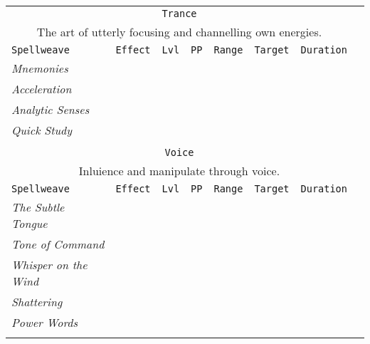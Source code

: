 \documentclass[10pt,a4paper]{article}
\begin{document}
\begin{table}[htbp!]
\begin{tabular}{llllllll}
	
    	
  \multicolumn{7}{c}{\texttt{Trance}}\\
  \multicolumn{7}{c}{The art of utterly focusing and channelling own energies.}\\
    \hline
 \texttt{Spellweave} & \texttt{Effect} & \texttt{Lvl} & \texttt{PP} & \texttt{Range} & \texttt{Target} & \texttt{Duration} \\
    \hline
    \multirow{1}{*}{\textit{Mnemonies}}&  & &&  &  & \\
    \hline
    \multirow{1}{*}{\textit{Acceleration}}&  & &&  &  & \\
    \hline
    \multirow{1}{*}{\textit{Analytic Senses}}&  & &&  &  & \\
    \hline
    \multirow{1}{*}{\textit{Quick Study}}&  & &&  &  & \\
	&&&&&&\\
	
	
	
 \multicolumn{7}{c}{\texttt{Voice}}\\
  \multicolumn{7}{c}{Inluience and manipulate through voice.}\\
    \hline
 \texttt{Spellweave} & \texttt{Effect} & \texttt{Lvl} & \texttt{PP} & \texttt{Range} & \texttt{Target} & \texttt{Duration} \\
    \hline
    \multirow{1}{*}{\textit{The Subtle Tongue}}&  & &&  &  & \\
    \hline
    \multirow{1}{*}{\textit{Tone of Command}}&  & &&  &  & \\
    \hline
    \multirow{1}{*}{\textit{Whisper on the Wind}}&  & &&  &  & \\
    \hline
    \multirow{1}{*}{\textit{Shattering}}&  & &&  &  & \\
    \hline
    \multirow{1}{*}{\textit{Power Words}}&  & &&  &  & \\
	&&&&&&\\
	
\end{tabular}
\end{table} 
\end{document}

